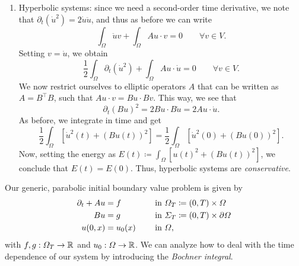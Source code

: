 \begin{enumerate}
    Defining the energy as $E(t) \coloneqq \int_\Omega u(t)^2$, we get
    \begin{equation}
        \frac{1}{2}E(t) = \frac{1}{2}E(0) - \int_0^T \underbrace{a(u,u)}_{\geq \alpha\|u\|^2>0} ds \implies \boxed{E(t) < E(0)}.
    \end{equation}
    We observe that energy decreases from the initial condition in a parabolic system. Thus, parabolic systems are called \emph{dissipative}.
    \item Hyperbolic systems: since we need a second-order time derivative, we note that $\partial_t(\dot{u}^2) = 2\dot{u}\ddot{u}$, and thus as before we can write
    \begin{equation}
        \int_\Omega \ddot{u}v + \int_\Omega A u\cdot v = 0 \qquad \forall v\in V.
    \end{equation}
    Setting $v=\dot{u}$, we obtain
    \begin{equation}
        \frac{1}{2}\int_\Omega \partial_t (\dot{u}^2) + \int_\Omega Au\cdot \dot{u} = 0 \qquad \forall v\in V.
    \end{equation}
    We now restrict ourselves to elliptic operators $A$ that can be written as $A=B^\top B$, such that $Au\cdot v = Bu\cdot Bv$. This way, we see that 
    \begin{equation}
        \partial_t (Bu)^2 = 2Bu \cdot B\dot{u} = 2Au\cdot \dot{u}.
    \end{equation}
    As before, we integrate in time and get 
    \begin{equation}
        \frac{1}{2} \int_\Omega \left[\dot{u}^2(t) + (Bu(t))^2\right] = \frac{1}{2} \int_\Omega \left[\dot{u}^2(0) + (Bu(0))^2\right].
    \end{equation}
    Now, setting the energy as $E(t)  \coloneqq  \int_\Omega \left[u(t)^2 + (Bu(t))^2\right]$, we conclude that $E(t) = E(0)$. Thus, hyperbolic systems are \emph{conservative}.
\end{enumerate}
Our generic, parabolic initial boundary value problem is given by
\begin{equation}\label{eq:parabolic-IBVP}
    \begin{aligned}
        \partial_t + Au &= f &&\quad \tin\Omega_T  \coloneqq  (0,T) \times \Omega\\
        \hfill Bu &= g &&\quad \tin\Sigma_T  \coloneqq  (0,T) \times \partial\Omega\\
        \hfill u(0,x)&= u_0(x) &&\quad \tin\Omega,
    \end{aligned}
\end{equation}
with $f,g:\Omega_T\to \mathbb{R}$ and $u_0:\Omega\to\mathbb{R}$. We can analyze how to deal with the time dependence of our system by introducing the \emph{Bochner integral}.

